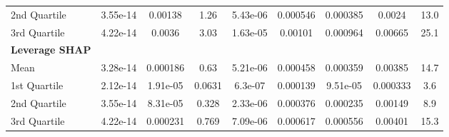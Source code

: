 {\begin{tabular} {lcccccccc}
\hspace{7pt}2nd Quartile & \cellcolor{gold!60}3.55e-14 & \cellcolor{silver!60}0.00138 & \cellcolor{silver!60}1.26 & \cellcolor{silver!60}5.43e-06 & \cellcolor{silver!60}0.000546 & \cellcolor{silver!60}0.000385 & \cellcolor{silver!60}0.0024 & \cellcolor{silver!60}13.0 \\ 
\hspace{7pt}3rd Quartile & \cellcolor{gold!60}4.22e-14 & \cellcolor{silver!60}0.0036 & \cellcolor{silver!60}3.03 & \cellcolor{silver!60}1.63e-05 & \cellcolor{silver!60}0.00101 & \cellcolor{silver!60}0.000964 & \cellcolor{silver!60}0.00665 & \cellcolor{silver!60}25.1 \\ 
\addlinespace[1ex] 
\textbf{Leverage SHAP} &  &  &  &  &  &  &  &  \\ 
\hspace{7pt}Mean & \cellcolor{silver!60}3.28e-14 & \cellcolor{gold!60}0.000186 & \cellcolor{gold!60}0.63 & \cellcolor{gold!60}5.21e-06 & \cellcolor{gold!60}0.000458 & \cellcolor{gold!60}0.000359 & \cellcolor{gold!60}0.00385 & \cellcolor{gold!60}14.7 \\ 
\hspace{7pt}1st Quartile & \cellcolor{gold!60}2.12e-14 & \cellcolor{gold!60}1.91e-05 & \cellcolor{gold!60}0.0631 & \cellcolor{gold!60}6.3e-07 & \cellcolor{gold!60}0.000139 & \cellcolor{gold!60}9.51e-05 & \cellcolor{gold!60}0.000333 & \cellcolor{gold!60}3.6 \\ 
\hspace{7pt}2nd Quartile & \cellcolor{silver!60}3.55e-14 & \cellcolor{gold!60}8.31e-05 & \cellcolor{gold!60}0.328 & \cellcolor{gold!60}2.33e-06 & \cellcolor{gold!60}0.000376 & \cellcolor{gold!60}0.000235 & \cellcolor{gold!60}0.00149 & \cellcolor{gold!60}8.9 \\ 
\hspace{7pt}3rd Quartile & \cellcolor{silver!60}4.22e-14 & \cellcolor{gold!60}0.000231 & \cellcolor{gold!60}0.769 & \cellcolor{gold!60}7.09e-06 & \cellcolor{gold!60}0.000617 & \cellcolor{gold!60}0.000556 & \cellcolor{gold!60}0.00401 & \cellcolor{gold!60}15.3 \\ 
\bottomrule
\end{tabular}}